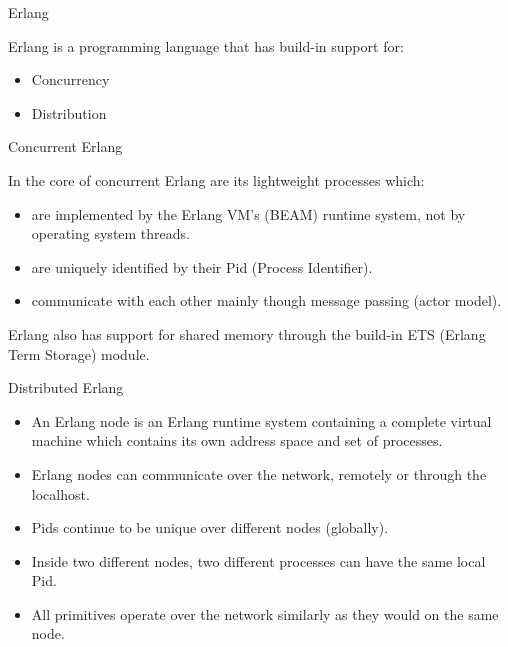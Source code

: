 \documentclass[9pt]{beamer}
\begin{document}
\begin{frame} {Erlang}

Erlang is a programming language that has build-in support for:

\begin{itemize}[<+->]
  \item Concurrency
  \item Distribution
\end{itemize}

\end{frame}
\begin{frame} {Concurrent Erlang}

In the core of concurrent Erlang are its lightweight processes which:

\begin{itemize}[<+->]
  \item are implemented by the Erlang VM's (BEAM) runtime system, not by operating system threads.
  \item are uniquely identified by their Pid (Process Identifier).
  \item communicate with each other mainly though message passing (actor model).

\end{itemize}
\pause

Erlang also has support for shared memory through the build-in ETS (Erlang Term Storage) module.

\end{frame}

\begin{frame} {Distributed Erlang}

\begin{itemize}[<+->]
\item An Erlang node is an Erlang runtime system containing a complete virtual machine which
contains its own address space and set of processes. 
\item Erlang nodes can communicate over the network, remotely or through the localhost. 
\item Pids continue to be unique over different
nodes (globally).
\item Inside two different nodes, two different processes can have the
same local Pid.
\item All primitives operate over the
network similarly as they would on the same node.

\end{itemize}

\end{frame}
\end{document}

